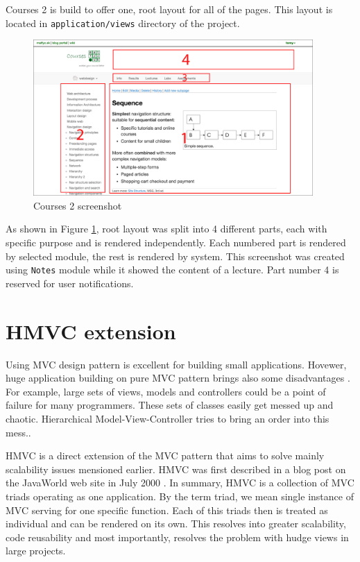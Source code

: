 Courses 2 is build to offer one, root layout for all of the pages. This layout is located in \texttt{application/views} directory of the project.

\begin{figure}[h]
    \centering
    \includegraphics[width=0.95\textwidth]{images/courses-labelled.png}
    \caption{Courses 2 screenshot}
    \label{courses2screen}
\end{figure}


As shown in Figure \ref{courses2screen}, root layout was split into 4 different parts, each with specific purpose and is rendered independently. Each numbered part is rendered by selected module, the rest is rendered by system. This screenshot was created using \texttt{Notes} module while it showed the content of a lecture. Part number 4 is reserved for user notifications.

\section{HMVC extension}
Using MVC design pattern is excellent for building small applications. Hovewer, huge application building on pure MVC pattern brings also some disadvantages \cite{culik}. For example, large sets of views, models and controllers could be a point of failure for many programmers. These sets of classes easily get messed up and chaotic. Hierarchical Model-View-Controller tries to bring an order into this mess.\cite{hmvc}.

HMVC is a direct extension of the MVC pattern that aims to solve mainly scalability issues mensioned earlier. HMVC was first described in a blog post on the JavaWorld web site in July 2000 \cite{hmvc}. In summary, HMVC is a collection of MVC triads operating as one application. By the term triad, we mean single instance of MVC serving for one specific function. Each of this triads then is treated as individual and can be rendered on its own. This resolves into greater scalability, code reusability and most importantly, resolves the problem with hudge views in large projects.

